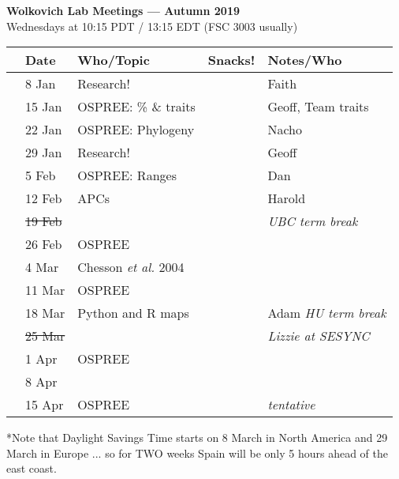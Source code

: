 \documentclass[11pt]{article}
\begin{document}
 
\raggedright
{}

\begin{center} 
{\large \textbf{Wolkovich Lab Meetings --- Autumn 2019}} \\ [2pt]
Wednesdays at 10:15 PDT / 13:15 EDT (FSC 3003 usually)\\
\end{center} 

\begin{center}
\begin{tabular}{ p{0.2 cm}  p{2 cm}  p{5 cm}  p{2 cm}  p{4 cm} }  \hline \hline
 & \textbf{Date}
   & \textbf{Who/Topic}
      & \textbf{Snacks!} 
         & \textbf{Notes/Who} \\ 
\hline \hline
 & 8 Jan & Research! &       & Faith  \\\hline
 & 15 Jan & OSPREE: \% \& traits   &  & Geoff, Team traits \\\hline
 & 22 Jan & OSPREE: Phylogeny &      & Nacho \\\hline  
 & 29 Jan & Research! &       &  Geoff\\\hline
 & 5 Feb & OSPREE: Ranges &  & Dan \\\hline
 & 12 Feb & APCs &    & Harold\\\hline
 & \sout{19 Feb} & &       & \emph{UBC term break}   \\\hline 
 & 26 Feb  & OSPREE &       & \\\hline
 & 4 Mar & Chesson \emph{et al.} 2004 &   &     \\\hline
 & 11 Mar & OSPREE &       & \\\hline
 & 18 Mar & Python and R maps &       & Adam  \emph{HU term break} \\\hline
 & \sout{25 Mar} & &       &\emph{Lizzie at SESYNC}   \\\hline
 & 1 Apr & OSPREE&   & \\\hline
 & 8 Apr & &    & \\\hline
 & 15 Apr &OSPREE &    & \emph{tentative} \\\hline

\hline
\end{tabular}
\end{center}
*Note that Daylight Savings Time starts on 8 March in North America and 29 March in Europe ... so for TWO weeks Spain will be only 5 hours ahead of the east coast.\\
\end{document}
